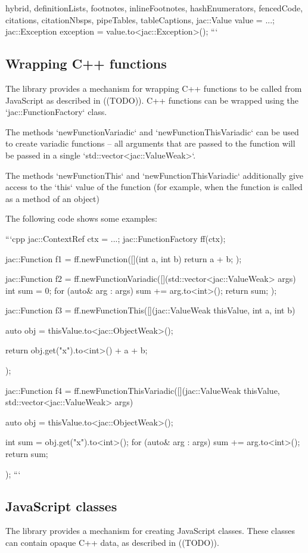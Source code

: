 \documentclass[
  digital,
  oneside,
  nosansbold,
  nocolorbold,
  lof,
  lot
]{fithesis4}
\begin{document}
\begin{markdown*}{%
  hybrid,
  definitionLists,
  footnotes,
  inlineFootnotes,
  hashEnumerators,
  fencedCode,
  citations,
  citationNbsps,
  pipeTables,
  tableCaptions,
}
jac::Value value = ...;
jac::Exception exception = value.to<jac::Exception>();
```

\subsection{Wrapping C++ functions}

The library provides a mechanism for wrapping C++ functions to be called from JavaScript as described in ((TODO)). C++ functions can be wrapped using the `jac::FunctionFactory` class.

The methods `newFunctionVariadic` and `newFunctionThisVariadic` can be used to create variadic functions -- all arguments that are
passed to the function will be passed in a single `std::vector<jac::ValueWeak>`.

The methods `newFunctionThis` and `newFunctionThisVariadic` additionally give access to the `this` value of the function (for example,
when the function is called as a method of an object)

The following code shows some examples:

```cpp
jac::ContextRef ctx = ...;
jac::FunctionFactory ff(ctx);

jac::Function f1 = ff.newFunction([](int a, int b) { return a + b; });

jac::Function f2 = ff.newFunctionVariadic([](std::vector<jac::ValueWeak> args) {
    int sum = 0;
    for (auto& arg : args) {
        sum += arg.to<int>();
    }
    return sum;
});

jac::Function f3 = ff.newFunctionThis([](jac::ValueWeak thisValue, int a, int b) {
    auto obj = thisValue.to<jac::ObjectWeak>();

    return obj.get("x").to<int>() + a + b;
});

jac::Function f4 = ff.newFunctionThisVariadic([](jac::ValueWeak thisValue, std::vector<jac::ValueWeak> args) {
    auto obj = thisValue.to<jac::ObjectWeak>();

    int sum = obj.get("x").to<int>();
    for (auto& arg : args) {
        sum += arg.to<int>();
    }
    return sum;
});
```

\subsection{JavaScript classes}

The library provides a mechanism for creating JavaScript classes. These classes can contain opaque C++ data, as described in ((TODO)).


\end{markdown*}
\end{document}
